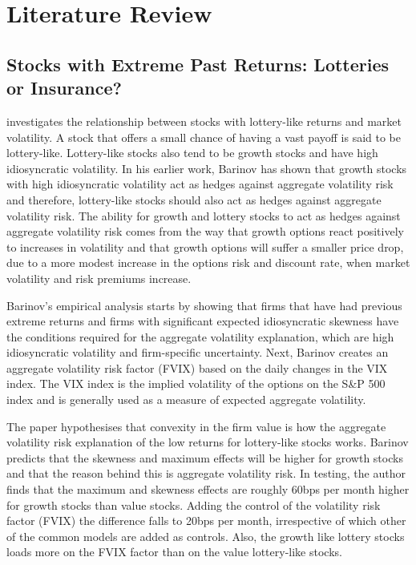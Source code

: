\documentclass[12pt, a4paper, oneside]{article}
\begin{document}
\section{Literature Review}\label{sec:lit_review}
\subsection{Stocks with Extreme Past Returns: Lotteries or Insurance?}
 investigates the relationship between stocks with lottery-like returns and market volatility. A stock that offers a small chance of having a vast payoff is said to be lottery-like. Lottery-like stocks also tend to be growth stocks and have high idiosyncratic volatility. In his earlier work, Barinov has shown that growth stocks with high idiosyncratic volatility act as hedges against aggregate volatility risk and therefore, lottery-like stocks should also act as hedges against aggregate volatility risk. The ability for growth and lottery stocks to act as hedges against aggregate volatility risk comes from the way that growth options react positively to increases in volatility and that growth options will suffer a smaller price drop, due to a more modest increase in the options risk and discount rate, when market volatility and risk premiums increase. 

Barinov’s empirical analysis starts by showing that firms that have had previous extreme returns and firms with significant expected idiosyncratic skewness have the conditions required for the aggregate volatility explanation, which are high idiosyncratic volatility and firm-specific uncertainty. Next, Barinov creates an aggregate volatility risk factor (FVIX) based on the daily changes in the VIX index. The VIX index is the implied volatility of the options on the S\&P 500 index and is generally used as a measure of expected aggregate volatility. 

The paper hypothesises that convexity in the firm value is how the aggregate volatility risk explanation of the low returns for lottery-like stocks works. Barinov predicts that the skewness and maximum effects will be higher for growth stocks and that the reason behind this is aggregate volatility risk. In testing, the author finds that the maximum and skewness effects are roughly 60bps per month higher for growth stocks than value stocks. Adding the control of the volatility risk factor (FVIX) the difference falls to 20bps per month, irrespective of which other of the common models are added as controls. Also, the growth like lottery stocks loads more on the FVIX factor than on the value lottery-like stocks. 
\end{document}
